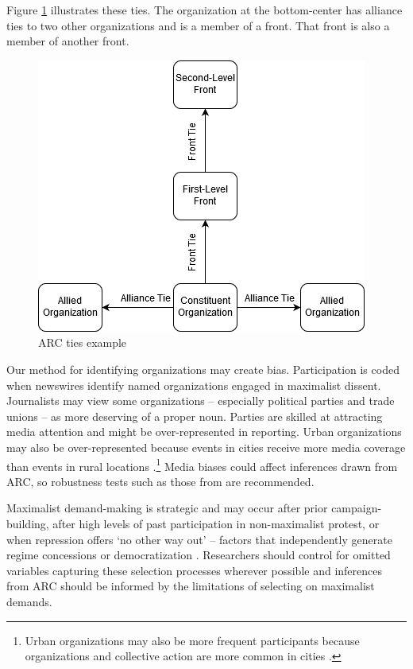 Figure \ref{fig:arc ties} illustrates these ties. The organization at the
bottom-center has alliance ties to two other organizations and is a member of a
front. That front is also a member of another front. 

\begin{figure}
    \centering
    \includegraphics[width = 0.9\columnwidth]{img/example_ties.png}
    \caption{ARC ties example}
    \label{fig:arc ties}
\end{figure}




Our method for identifying organizations may create bias. Participation is coded
when newswires identify named organizations engaged in maximalist dissent.
Journalists may view some organizations -- especially political parties and
trade unions -- as more deserving of a proper noun. Parties are skilled at
attracting media attention and might be over-represented in reporting. Urban
organizations may also be over-represented because events in cities receive more
media coverage than events in rural locations \citep{Kalyvas2004, Eck2012,
Day2015}.\footnote{Urban organizations may also be more frequent participants
because organizations and collective action are more common in cities
\citep{Weidmann2018, Nicholls2008, Miller2013}.} Media biases could affect
inferences drawn from ARC, so robustness tests such as those from
\citet{Weidmann2016} are recommended. 

Maximalist demand-making is strategic and may occur after prior
campaign-building, after high levels of past participation in non-maximalist
protest, or when repression offers `no other way out' \citep{Goodwin2001} --
factors that independently generate regime concessions or democratization
\citep{Brancati2016, Klein2018}. Researchers should control for omitted
variables capturing these selection processes wherever possible and inferences
from ARC should be informed by the limitations of selecting on maximalist
demands.

